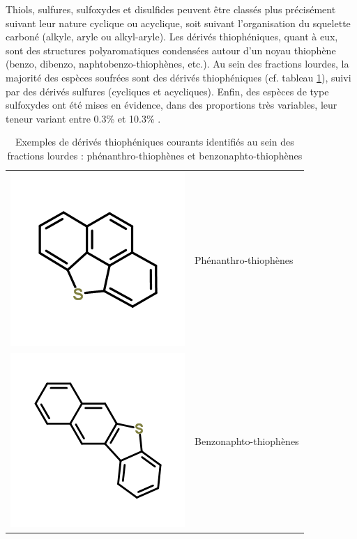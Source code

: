 Thiols, sulfures, sulfoxydes et disulfides peuvent être classés plus précisément suivant leur nature cyclique ou acyclique, soit suivant l'organisation du squelette carboné (alkyle, aryle ou alkyl-aryle). Les dérivés thiophéniques, quant à eux, sont des structures polyaromatiques condensées autour d'un noyau thiophène (benzo, dibenzo, naphtobenzo-thiophènes, etc.). Au sein des fractions lourdes, la majorité des espèces soufrées sont des dérivés thiophéniques (cf. tableau \ref{tab:soufre-ex}), suivi par des dérivés sulfures (cycliques et acycliques). Enfin, des espèces de type sulfoxydes ont été mises en évidence, dans des proportions très variables, leur teneur variant entre 0.3\% et 10.3\% \cite{merdrignac2007physicochemical, speight2004petroleum}.

\begin{table}[h!]
	\begin{center}
		\begin{tabular}{rl}
			\hline
			\includegraphics[scale=0.4]{image/phenanthro-thiophene} & Phénanthro-thiophènes \\
			\includegraphics[scale=0.4]{image/benzo-naphto-thiophene} & Benzonaphto-thiophènes \\
			\hline 
		\end{tabular}
	\end{center}
	\caption{Exemples de dérivés thiophéniques courants identifiés au sein des fractions lourdes : phénanthro-thiophènes et benzonaphto-thiophènes}
	\label{tab:soufre-ex}
\end{table}


